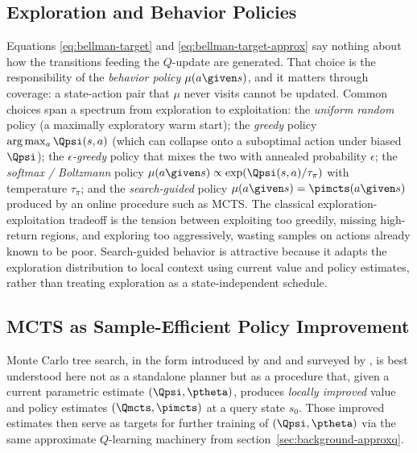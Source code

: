 \subsection{Exploration and Behavior Policies}
\label{sec:background-exploration}

Equations \eqref{eq:bellman-target} and \eqref{eq:bellman-target-approx}
say nothing about how the transitions feeding the $Q$-update are
generated. That choice is the responsibility of the \emph{behavior
policy} $\mu(a \given s)$, and it matters through coverage: a state-action
pair that $\mu$ never visits cannot be updated. Common choices span a
spectrum from exploration to exploitation: the \emph{uniform random}
policy (a maximally exploratory warm start); the \emph{greedy} policy
$\arg\max_a \Qpsi(s, a)$ (which can collapse onto a suboptimal action
under biased $\Qpsi$); the \emph{$\epsilon$-greedy} policy that mixes the
two with annealed probability $\epsilon$; the \emph{softmax / Boltzmann}
policy $\mu(a \given s) \propto \exp(\Qpsi(s, a) / \tau_{\pi})$ with
temperature $\tau_{\pi}$; and the \emph{search-guided} policy
$\mu(a \given s) = \pimcts(a \given s)$ produced by an online procedure
such as MCTS. The classical exploration-exploitation tradeoff
\citep{sutton2018reinforcement} is the tension between exploiting too
greedily, missing high-return regions, and exploring too aggressively,
wasting samples on actions already known to be poor. Search-guided
behavior is attractive because it adapts the exploration distribution to
local context using current value and policy estimates, rather than
treating exploration as a state-independent schedule.

\subsection{MCTS as Sample-Efficient Policy Improvement}
\label{sec:background-mcts}

Monte Carlo tree search, in the form introduced by
\citet{kocsis2006bandit} and \citet{coulom2006efficient} and surveyed by
\citet{browne2012survey}, is best understood here not as a standalone
planner but as a procedure that, given a current parametric estimate
$(\Qpsi, \ptheta)$, produces \emph{locally improved} value and policy
estimates $(\Qmcts, \pimcts)$ at a query state $s_0$. Those improved
estimates then serve as targets for further training of $(\Qpsi,
\ptheta)$ via the same approximate $Q$-learning machinery from
section~\ref{sec:background-approxq}.

